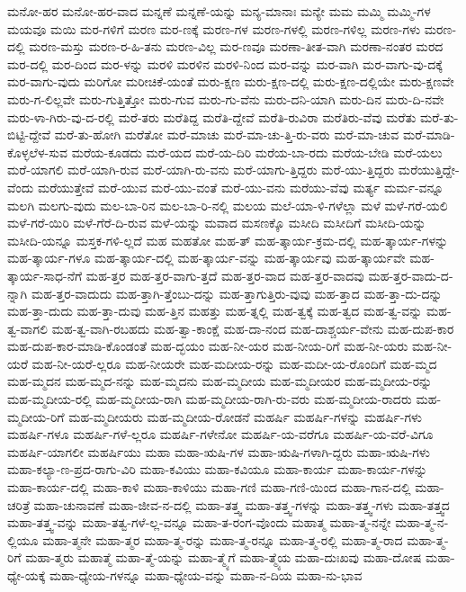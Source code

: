 {ಮನೋ-ಹರ
ಮನೋ-ಹರ-ವಾದ
ಮನ್ನಣೆ
ಮನ್ನಣೆ-ಯನ್ನು
ಮನ್ಯ-ಮಾನಾಃ
ಮನ್ಯೇ
ಮಮ
ಮಮ್ಮಿ
ಮಮ್ಮಿ-ಗಳ
ಮಯವೂ
ಮಯಿ
ಮರ-ಗಳಿಗೆ
ಮರಣ
ಮರ-ಣಕ್ಕೆ
ಮರಣ-ಗಳ
ಮರಣ-ಗಳಲ್ಲಿ
ಮರಣ-ಗಳಿಲ್ಲ
ಮರಣ-ಗಳು
ಮರಣ-ದಲ್ಲಿ
ಮರಣ-ಮಸ್ತು
ಮರಣ-ರ-ಹಿ-ತನು
ಮರಣ-ವಿಲ್ಲ
ಮರ-ಣವೂ
ಮರಣಾ-ತೀತ-ವಾಗಿ
ಮರಣಾ-ನಂತರ
ಮರದ
ಮರ-ದಲ್ಲಿ
ಮರ-ದಿಂದ
ಮರ-ಳನ್ನು
ಮರಳಿ
ಮರಳಿನ
ಮರಳಿ-ನಿಂದ
ಮರ-ವನ್ನು
ಮರ-ವಾಗಿ
ಮರ-ವಾಗು-ವು-ದಕ್ಕೆ
ಮರ-ವಾಗು-ವುದು
ಮರಿಗೋ
ಮರೀಚಿಕೆ-ಯಂತೆ
ಮರು-ಕ್ಷಣ
ಮರು-ಕ್ಷಣ-ದಲ್ಲಿ
ಮರು-ಕ್ಷಣ-ದಲ್ಲಿಯೇ
ಮರು-ಕ್ಷಣವೇ
ಮರು-ಗ-ಲಿಲ್ಲವೇ
ಮರು-ಗುತ್ತಿತ್ತೋ
ಮರು-ಗುವ
ಮರು-ಗು-ವೆನು
ಮರು-ದನಿ-ಯಾಗಿ
ಮರು-ದಿನ
ಮರು-ದಿ-ನವೇ
ಮರು-ಳಾ-ಗಿರು-ವು-ದ-ರಲ್ಲಿ
ಮರೆ-ತರು
ಮರೆತಿದ್ದ
ಮರೆತಿ-ದ್ದೇವೆ
ಮರೆತಿ-ರುವಿರಾ
ಮರೆತಿರು-ವೆವು
ಮರೆತು
ಮರೆ-ತು-ಬಿಟ್ಟಿ-ದ್ದೇವೆ
ಮರೆ-ತು-ಹೋಗಿ
ಮರೆತೋ
ಮರೆ-ಮಾಚು
ಮರೆ-ಮಾ-ಚು-ತ್ತಿ-ರು-ವರು
ಮರೆ-ಮಾ-ಚುವ
ಮರೆ-ಮಾಡಿ-ಕೊಳ್ಳಲೆಳ-ಸುವ
ಮರೆಯ-ಕೂಡದು
ಮರೆ-ಯದ
ಮರೆ-ಯ-ದಿರಿ
ಮರೆಯ-ಬಾ-ರದು
ಮರೆಯ-ಬೇಡಿ
ಮರೆ-ಯಲು
ಮರೆ-ಯಾಗಲಿ
ಮರೆ-ಯಾಗಿ-ರುವ
ಮರೆ-ಯಾಗಿ-ರು-ವನು
ಮರೆ-ಯಾಗು-ತ್ತಿದ್ದರು
ಮರೆ-ಯು-ತ್ತಿದ್ದರು
ಮರೆಯುತ್ತಿದ್ದೇ-ವೆಂದು
ಮರೆಯುತ್ತೇವೆ
ಮರೆ-ಯುವ
ಮರೆ-ಯು-ವಂತೆ
ಮರೆ-ಯು-ವನು
ಮರೆಯು-ವೆವು
ಮರ್ತ್ಯ
ಮರ್ಮ-ವನ್ನೂ
ಮಲಗಿ
ಮಲಗು-ವುದು
ಮಲ-ಬಾ-ರಿನ
ಮಲ-ಬಾ-ರಿ-ನಲ್ಲಿ
ಮಲಯ
ಮಲೆ-ಯಾ-ಳಿ-ಗಳೆಲ್ಲಾ
ಮಳೆ
ಮಳೆ-ಗರೆ-ಯಲಿ
ಮಳೆ-ಗರೆ-ಯಿರಿ
ಮಳೆ-ಗೆರೆ-ದಿ-ರುವ
ಮಳೆ-ಯನ್ನು
ಮವಾದ
ಮಸಣಕ್ಕೊ
ಮಸೀದಿ
ಮಸೀದಿಗೆ
ಮಸೀದಿ-ಯನ್ನು
ಮಸೀದಿ-ಯನ್ನೂ
ಮಸ್ತಕ-ಗಳಿ-ಲ್ಲದೆ
ಮಹ
ಮಹತೋ
ಮಹ-ತ್
ಮಹ-ತ್ಕಾರ್ಯ-ಕ್ರಮ-ದಲ್ಲಿ
ಮಹ-ತ್ಕಾರ್ಯ-ಗಳನ್ನು
ಮಹ-ತ್ಕಾರ್ಯ-ಗಳೂ
ಮಹ-ತ್ಕಾರ್ಯ-ದಲ್ಲಿ
ಮಹ-ತ್ಕಾರ್ಯ-ವನ್ನು
ಮಹ-ತ್ಕಾರ್ಯವು
ಮಹ-ತ್ಕಾರ್ಯವೇ
ಮಹ-ತ್ಕಾರ್ಯ-ಸಾಧ-ನೆಗೆ
ಮಹ-ತ್ತರ
ಮಹ-ತ್ತರ-ವಾಗು-ತ್ತದೆ
ಮಹ-ತ್ತರ-ವಾದ
ಮಹ-ತ್ತರ-ವಾದವು
ಮಹ-ತ್ತರ-ವಾದು-ದ-ನ್ನಾಗಿ
ಮಹ-ತ್ತರ-ವಾದುದು
ಮಹ-ತ್ತಾಗಿ-ತ್ತೆಂಬು-ದನ್ನು
ಮಹ-ತ್ತಾಗುತ್ತಿರು-ವುವು
ಮಹ-ತ್ತಾದ
ಮಹ-ತ್ತಾ-ದು-ದನ್ನು
ಮಹ-ತ್ತಾ-ದುದು
ಮಹ-ತ್ತಾ-ದುವು
ಮಹ-ತ್ತಿನ
ಮಹತ್ತು
ಮಹ-ತ್ನಲ್ಲಿ
ಮಹ-ತ್ವಕ್ಕೆ
ಮಹ-ತ್ವದ
ಮಹ-ತ್ವ-ವನ್ನು
ಮಹ-ತ್ವ-ವಾಗಲಿ
ಮಹ-ತ್ವ-ವಾಗಿ-ರಬಹದು
ಮಹ-ತ್ವಾ-ಕಾಂಕ್ಷೆ
ಮಹ-ದಾ-ನಂದ
ಮಹ-ದಾಶ್ಚರ್ಯ-ವೇನು
ಮಹ-ದುಪ-ಕಾರ
ಮಹ-ದುಪ-ಕಾರ-ಮಾಡಿ-ಕೊಂಡಂತೆ
ಮಹ-ದ್ಭಯಂ
ಮಹ-ನೀ-ಯರ
ಮಹ-ನೀಯ-ರಿಗೆ
ಮಹ-ನೀ-ಯರು
ಮಹ-ನೀ-ಯರೆ
ಮಹ-ನೀ-ಯರೆ-ಲ್ಲರೂ
ಮಹ-ನೀಯರೇ
ಮಹ-ಮದೀಯ-ರನ್ನು
ಮಹ-ಮದೀ-ಯ-ರೊಂದಿಗೆ
ಮಹ-ಮ್ಮದ
ಮಹ-ಮ್ಮದನ
ಮಹ-ಮ್ಮದ-ನನ್ನು
ಮಹ-ಮ್ಮದನು
ಮಹ-ಮ್ಮದೀಯ
ಮಹ-ಮ್ಮದೀಯರ
ಮಹ-ಮ್ಮದೀಯ-ರನ್ನು
ಮಹ-ಮ್ಮದೀಯ-ರಲ್ಲಿ
ಮಹ-ಮ್ಮದೀಯ-ರಾಗಿ
ಮಹ-ಮ್ಮದೀಯ-ರಾಗಿ-ರು-ವರು
ಮಹ-ಮ್ಮದೀಯ-ರಾದರು
ಮಹ-ಮ್ಮದೀಯ-ರಿಗೆ
ಮಹ-ಮ್ಮದೀಯರು
ಮಹ-ಮ್ಮದೀಯ-ರೋಡನೆ
ಮಹರ್ಷಿ
ಮಹರ್ಷಿ-ಗಳನ್ನು
ಮಹರ್ಷಿ-ಗಳು
ಮಹರ್ಷಿ-ಗಳೂ
ಮಹರ್ಷಿ-ಗಳೆ-ಲ್ಲರೂ
ಮಹರ್ಷಿ-ಗಳೇನೋ
ಮಹರ್ಷಿ-ಯ-ವರೆಗೂ
ಮಹರ್ಷಿ-ಯ-ವರೆ-ವಿಗೂ
ಮಹರ್ಷಿ-ಯಾಗಲೀ
ಮಹರ್ಷಿಯು
ಮಹಾ
ಮಹಾ-ಋಷಿ-ಗಳ
ಮಹಾ-ಋಷಿ-ಗಳಾಗಿ-ದ್ದರು
ಮಹಾ-ಋಷಿ-ಗಳು
ಮಹಾ-ಕಲ್ಯಾ-ಣ-ಪ್ರದ-ರಾಗು-ವಿರಿ
ಮಹಾ-ಕವಿಯು
ಮಹಾ-ಕವಿಯೂ
ಮಹಾ-ಕಾರ್ಯ
ಮಹಾ-ಕಾರ್ಯ-ಗಳನ್ನು
ಮಹಾ-ಕಾರ್ಯ-ದಲ್ಲಿ
ಮಹಾ-ಕಾಳಿ
ಮಹಾ-ಕಾಳಿಯು
ಮಹಾ-ಗಣಿ
ಮಹಾ-ಗಣಿ-ಯಿಂದ
ಮಹಾ-ಗಾನ-ದಲ್ಲಿ
ಮಹಾ-ಚರಿತ್ರೆ
ಮಹಾ-ಚುನಾವಣೆ
ಮಹಾ-ಜೀವ-ನ-ದಲ್ಲಿ
ಮಹಾ-ತತ್ತ್ವ
ಮಹಾ-ತತ್ತ್ವ-ಗಳನ್ನು
ಮಹಾ-ತತ್ತ್ವ-ಗಳು
ಮಹಾ-ತತ್ತ್ವದ
ಮಹಾ-ತತ್ತ್ವ-ವನ್ನು
ಮಹಾ-ತತ್ವ-ಗಳೆ-ಲ್ಲ-ವನ್ನೂ
ಮಹಾ-ತ-ರಂಗ-ವೊಂದು
ಮಹಾತ್ಮ
ಮಹಾ-ತ್ಮ-ನನ್ನೇ
ಮಹಾ-ತ್ಮ-ನ-ಲ್ಲಿಯೂ
ಮಹಾ-ತ್ಮನೇ
ಮಹಾ-ತ್ಮರ
ಮಹಾ-ತ್ಮ-ರನ್ನು
ಮಹಾ-ತ್ಮ-ರನ್ನೂ
ಮಹಾ-ತ್ಮ-ರಲ್ಲಿ
ಮಹಾ-ತ್ಮ-ರಾದ
ಮಹಾ-ತ್ಮ-ರಿಗೆ
ಮಹಾ-ತ್ಮರು
ಮಹಾತ್ಮೆ
ಮಹಾ-ತ್ಮೆ-ಯನ್ನು
ಮಹಾ-ತ್ಮ್ಯೆಗೆ
ಮಹಾ-ತ್ಮ್ಯೆಯ
ಮಹಾ-ದುಃಖವು
ಮಹಾ-ದೋಷ
ಮಹಾ-ಧ್ಯೇ-ಯಕ್ಕೆ
ಮಹಾ-ಧ್ಯೇಯ-ಗಳನ್ನೂ
ಮಹಾ-ಧ್ಯೇಯ-ವನ್ನು
ಮಹಾ-ನ-ದಿಯ
ಮಹಾ-ನು-ಭಾವ
}
